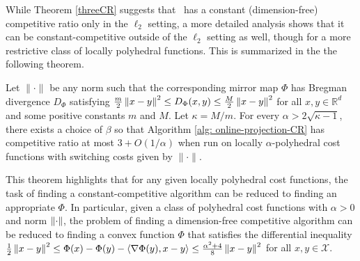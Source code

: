 
While Theorem \ref{threeCR} suggests that \ouralg\ has a constant (dimension-free) competitive ratio only in the $\ell_2$ setting, a more detailed analysis shows that it can be constant-competitive outside of the $\ell_2$ setting as well, though for a more restrictive class of locally polyhedral functions.  This is summarized in the the following theorem.

\begin{theorem}\label{generalconstant}
Let $\| \cdot \|$ be any norm such that the corresponding mirror map $\Phi$ has Bregman divergence $D_{\Phi}$ satisfying $\frac{m}{2}\left\lVert x-y \right\rVert^2 \le D_{\Phi}(x,y) \le \frac{M}{2}\left\lVert x-y \right\rVert^2$  
for all $x, y \in \mathbb{R}^d$ and some positive constants $m$ and $M$. Let $\kappa = M/m$. For every $\alpha > 2\sqrt{\kappa - 1}$, there exists a choice of $\beta$ so that Algorithm \ref{alg: online-projection-CR} has competitive ratio at most $3 + O(1/\alpha)$ when run on locally $\alpha$-polyhedral cost functions with switching costs given by $\| \cdot \|$.
\end{theorem}

This theorem highlights that for any given locally polyhedral cost functions, the task of finding a constant-competitive algorithm can be reduced to finding an appropriate $\Phi$.  In particular, given a class of polyhedral cost functions with $\alpha >0$ and norm $\left\lVert \cdot \right\rVert$, the problem of finding a dimension-free competitive algorithm can be reduced to finding a convex function $\Phi$ that satisfies the differential inequality $\frac{1}{2}\left\lVert x-y \right\rVert^2\le \Phi(x) - \Phi(y) - \langle \nabla \Phi(y), x - y\rangle \le \frac{\alpha^2+4}{8}\left\lVert x-y \right\rVert^2$ for all $x,y \in \mathcal{X}$.



